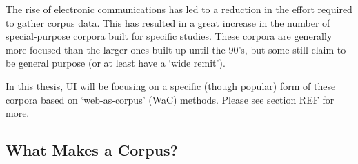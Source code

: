 % 


The rise of electronic communications has led to a reduction in the effort required to gather corpus data.  This has resulted in a great increase in the number of special-purpose corpora built for specific studies.  These corpora are generally more focused than the larger ones built up until the 90's, but some still claim to be general purpose (or at least have a `wide remit').  


In this thesis, UI will be focusing on a specific (though popular) form of these corpora based on `web-as-corpus' (WaC) methods.  Please see section REF for more.





















\subsection{What Makes a Corpus?} %

